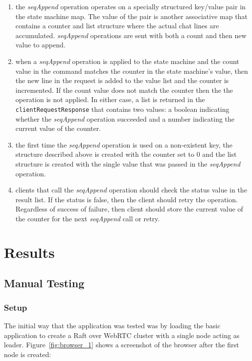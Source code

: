 \documentclass[9pt]{extarticle}
\begin{document}
\begin{multicols}{2}
\begin{enumerate}
\item the \emph{seqAppend} operation operates on a specially structured
    key/value pair in the state machine map. The value of the pair is
    another associative map that contains a counter and list structure
    where the actual chat lines are accumulated. \emph{seqAppend}
    operations are sent with both a count and then new value to
    append.
\item when a \emph{seqAppend} operation is applied to the state
    machine and the count value in the command matches the counter in
    the state machine's value, then the new line in the request is
    added to the value list and the counter is incremented. If the count
    value does not match the counter then the the operation is not
    applied. In either case, a list is returned in the
    \texttt{clientRequestResponse} that contains two values: a boolean
    indicating whether the \emph{seqAppend} operation succeeded and
    a number indicating the current value of the counter.
\item the first time the \emph{seqAppend} operation is used on a non-existent
    key, the structure described above is created with the counter set
    to 0 and the list structure is created with the single value that
    was passed in the \emph{seqAppend} operation.
\item clients that call the \emph{seqAppend} operation should check the
    status value in the result list. If the status is false, then the
    client should retry the operation. Regardless of success of
    failure, then client should store the current value of the counter
    for the next \emph{seqAppend} call or retry.
\end{enumerate}

\section{Results}

\subsection{Manual Testing}

\subsubsection{Setup}

The initial way that the application was tested was by loading the
basic application to create a Raft over WebRTC cluster with a single
node acting as leader. Figure~\ref{fig:browser_1} shows a screenshot
of the browser after the first node is created:


\end{multicols}
\end{document}
